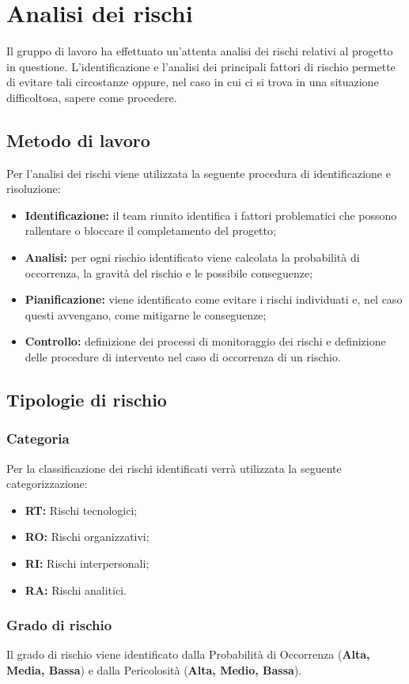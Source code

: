 \section{Analisi dei rischi}
Il gruppo di lavoro ha effettuato un'attenta analisi dei rischi relativi al progetto in questione. L'identificazione e l'analisi dei principali fattori di rischio permette di evitare tali circostanze oppure, nel caso in cui ci si trova in una situazione difficoltosa, sapere come procedere.
\subsection{Metodo di lavoro}
Per l'analisi dei rischi viene utilizzata la seguente procedura di identificazione e risoluzione:
\begin{itemize}
	\item \textbf{Identificazione:} il team riunito identifica i fattori problematici che possono rallentare o bloccare il completamento del progetto;
	\item \textbf{Analisi:} per ogni rischio identificato viene calcolata la probabilità di occorrenza, la gravità del rischio e le possibile conseguenze;
	\item \textbf{Pianificazione:} viene identificato come evitare i rischi individuati e, nel caso questi avvengano, come mitigarne le conseguenze;
	\item \textbf{Controllo:} definizione dei processi di monitoraggio dei rischi e definizione delle procedure di intervento nel caso di occorrenza di un rischio.
\end{itemize}
\subsection{Tipologie di rischio}
\subsubsection{Categoria}
Per la classificazione dei rischi identificati verrà utilizzata la seguente categorizzazione:
\begin{itemize}
	\item \textbf{RT:} Rischi tecnologici;
	\item \textbf{RO:} Rischi organizzativi;
	\item \textbf{RI:} Rischi interpersonali;
	\item \textbf{RA:} Rischi analitici.
\end{itemize}
\subsubsection{Grado di rischio}
Il grado di rischio viene identificato dalla Probabilità di Occorrenza (\textbf{Alta, Media, Bassa}) e dalla Pericolosità (\textbf{Alta, Medio, Bassa}).
